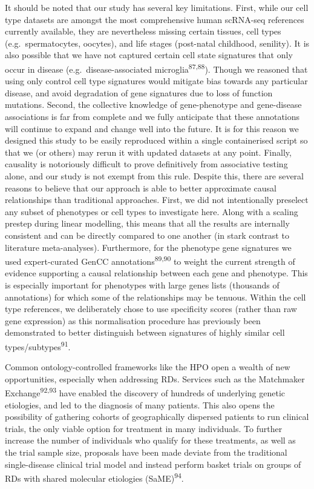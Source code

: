 \documentclass[
]{article}
\begin{document}
It should be noted that our study has several key limitations. First,
while our cell type datasets are amongst the most comprehensive human
scRNA-seq references currently available, they are nevertheless missing
certain tissues, cell types (e.g.~spermatocytes, oocytes), and life
stages (post-natal childhood, senility). It is also possible that we
have not captured certain cell state signatures that only occur in
disease (e.g.~disease-associated microglia\textsuperscript{87,88}).
Though we reasoned that using only control cell type signatures would
mitigate bias towards any particular disease, and avoid degradation of
gene signatures due to loss of function mutations. Second, the
collective knowledge of gene-phenotype and gene-disease associations is
far from complete and we fully anticipate that these annotations will
continue to expand and change well into the future. It is for this
reason we designed this study to be easily reproduced within a single
containerised script so that we (or others) may rerun it with updated
datasets at any point. Finally, causality is notoriously difficult to
prove definitively from associative testing alone, and our study is not
exempt from this rule. Despite this, there are several reasons to
believe that our approach is able to better approximate causal
relationships than traditional approaches. First, we did not
intentionally preselect any subset of phenotypes or cell types to
investigate here. Along with a scaling prestep during linear modelling,
this means that all the results are internally consistent and can be
directly compared to one another (in stark contrast to literature
meta-analyses). Furthermore, for the phenotype gene signatures we used
expert-curated GenCC annotations\textsuperscript{89,90} to weight the
current strength of evidence supporting a causal relationship between
each gene and phenotype. This is especially important for phenotypes
with large genes lists (thousands of annotations) for which some of the
relationships may be tenuous. Within the cell type references, we
deliberately chose to use specificity scores (rather than raw gene
expression) as this normalisation procedure has previously been
demonstrated to better distinguish between signatures of highly similar
cell types/subtypes\textsuperscript{91}.

Common ontology-controlled frameworks like the HPO open a wealth of new
opportunities, especially when addressing RDs. Services such as the
Matchmaker Exchange\textsuperscript{92,93} have enabled the discovery of
hundreds of underlying genetic etiologies, and led to the diagnosis of
many patients. This also opens the possibility of gathering cohorts of
geographically dispersed patients to run clinical trials, the only
viable option for treatment in many individuals. To further increase the
number of individuals who qualify for these treatments, as well as the
trial sample size, proposals have been made deviate from the traditional
single-disease clinical trial model and instead perform basket trials on
groups of RDs with shared molecular etiologies
(SaME)\textsuperscript{94}.
\end{document}
